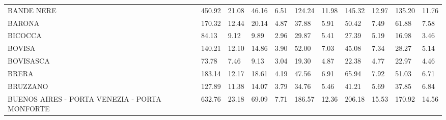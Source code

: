 \begin{table}[H]
{{\begin{tabular}{lp{1.3cm}p{1.3cm}p{1.3cm}p{1.3cm}p{1.3cm}p{1.3cm}p{1.3cm}p{1.3cm}p{1.3cm}p{1.3cm}}
BANDE NERE                                         &                    450.92 &                 21.08 &                       46.16 &                    6.51 &                      124.24 &                   11.98 &                      145.32 &                   12.97 &                    135.20 &                 11.76 \\
BARONA                                             &                    170.32 &                 12.44 &                       20.14 &                    4.87 &                       37.88 &                    5.91 &                       50.42 &                    7.49 &                     61.88 &                  7.58 \\
BICOCCA                                            &                     84.13 &                  9.12 &                        9.89 &                    2.96 &                       29.87 &                    5.41 &                       27.39 &                    5.19 &                     16.98 &                  3.46 \\
BOVISA                                             &                    140.21 &                 12.10 &                       14.86 &                    3.90 &                       52.00 &                    7.03 &                       45.08 &                    7.34 &                     28.27 &                  5.14 \\
BOVISASCA                                          &                     73.78 &                  7.46 &                        9.13 &                    3.04 &                       19.30 &                    4.87 &                       22.38 &                    4.77 &                     22.97 &                  4.46 \\
BRERA                                              &                    183.14 &                 12.17 &                       18.61 &                    4.19 &                       47.56 &                    6.91 &                       65.94 &                    7.92 &                     51.03 &                  6.71 \\
BRUZZANO                                           &                    127.89 &                 11.38 &                       14.07 &                    3.79 &                       34.76 &                    5.46 &                       41.21 &                    5.69 &                     37.85 &                  6.84 \\
BUENOS AIRES - PORTA VENEZIA - PORTA MONFORTE      &                    632.76 &                 23.18 &                       69.09 &                    7.71 &                      186.57 &                   12.36 &                      206.18 &                   15.53 &                    170.92 &                 14.56 \\

\end{tabular}}}
\end{table}

